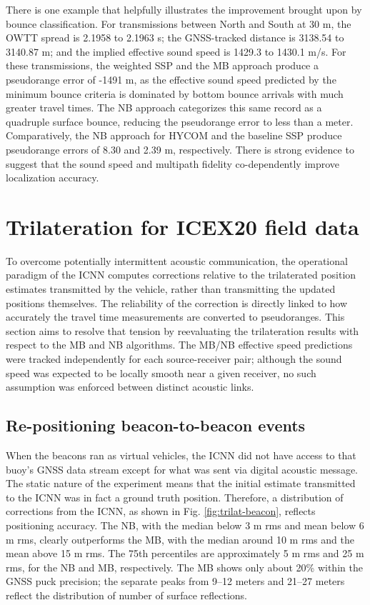 \documentclass[preprint,TurnOnLineNumbers]{JASA}
\newcommand{\llabel}[1]{\hypertarget{llineno:#1}{\linelabel{#1}}}
\begin{document}
\llabel{1.23} There is one example that helpfully illustrates the improvement brought upon by bounce classification.
For transmissions between North and South at 30 m, the OWTT spread is 2.1958 to 2.1963 s; the GNSS-tracked distance is 3138.54 to 3140.87 m; and the implied effective sound speed is 1429.3 to 1430.1 m/s.
For these transmissions, the weighted SSP and the MB approach produce a pseudorange error of -1491 m, as the effective sound speed predicted by the minimum bounce criteria is dominated by bottom bounce arrivals with much greater travel times.
The NB approach categorizes this same record as a quadruple surface bounce, reducing the pseudorange error to less than a meter.
Comparatively, the NB approach for HYCOM and the baseline SSP produce pseudorange errors of 8.30 and 2.39 m, respectively. 
There is strong evidence to suggest that the sound speed and multipath fidelity co-dependently improve localization accuracy.

\clearpage
\section{Trilateration for ICEX20 field data}\label{sec:trilat}

To overcome potentially intermittent acoustic communication, the operational paradigm of the ICNN computes corrections relative to the trilaterated position estimates transmitted by the vehicle, rather than transmitting the updated positions themselves.
The reliability of the correction is directly linked to how accurately the travel time measurements are converted to pseudoranges.
This section aims to resolve that tension by reevaluating the trilateration results with respect to the MB and NB algorithms.
The MB/NB effective speed predictions were tracked independently for each source-receiver pair; although the sound speed was expected to be locally smooth near a given receiver, no such assumption was enforced between distinct acoustic links.

\subsection{Re-positioning beacon-to-beacon events}

When the beacons ran as virtual vehicles, the ICNN did not have access to that buoy's GNSS data stream except for what was sent via digital acoustic message.
The static nature of the experiment means that the initial estimate transmitted to the ICNN was in fact a ground truth position.
Therefore, a distribution of corrections from the ICNN, as shown in Fig. \ref{fig:trilat-beacon}, reflects positioning accuracy.
The NB, with the median below 3 m rms and mean below 6 m rms, clearly outperforms the MB, with the median around 10 m rms and the mean above 15 m rms. 
The 75th percentiles are approximately 5 m rms and 25 m rms, for the NB and MB, respectively.
The MB shows only about 20\% within the GNSS puck precision; the separate peaks from 9--12 meters and 21--27 meters reflect the distribution of number of surface reflections.
\end{document}
